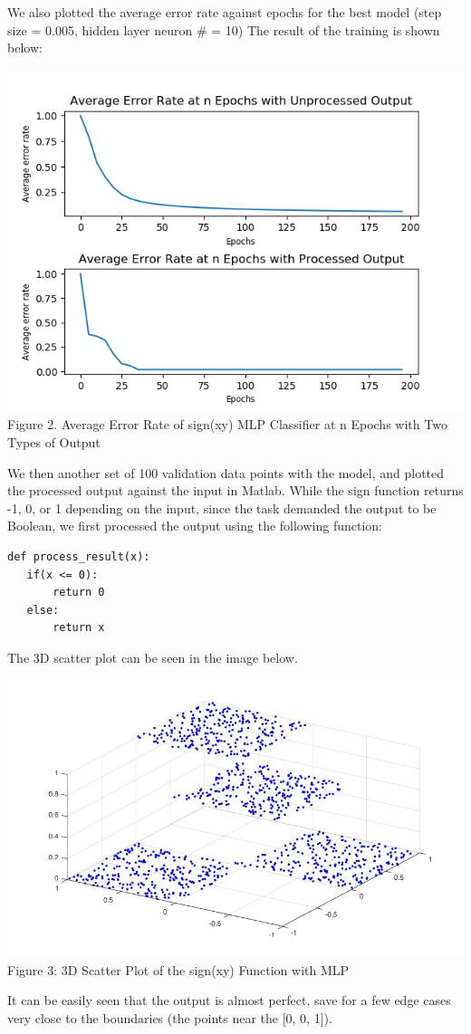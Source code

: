 \documentclass[a4paper]{article}
\begin{document}
We also plotted the average error rate against epochs for the best model (step size = 0.005, hidden layer neuron \# = 10) The result of the training is shown below:
\begin{center}
	\includegraphics[scale=0.5]{resextra.png}\\
	Figure 2. Average Error Rate of sign(xy) MLP Classifier at n Epochs with Two Types of Output
\end{center}
We then another set of 100 validation data points with the model, and plotted the processed output against the input in Matlab. While the sign function returns -1, 0, or 1 depending on the input, since the task demanded the output to be Boolean, we first processed the output using the following function:
\begin{lstlisting}
def process_result(x):
   if(x <= 0):
       return 0
   else:
       return x
\end{lstlisting}
The 3D scatter plot can be seen in the image below.\\
\begin{center}
	\includegraphics[scale=0.4]{index.jpg}\\
	Figure 3: 3D Scatter Plot of the sign(xy) Function with MLP
\end{center}
It can be easily seen that the output is almost perfect, save for a few edge cases very close to the boundaries (the points near the [0, 0, 1]).
\end{document}
